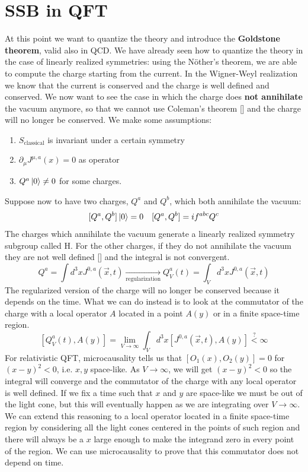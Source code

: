 \documentclass[../main.tex]{subfiles}
\begin{document}
\section{SSB in QFT}
At this point we want to quantize the theory and introduce the \textbf{Goldstone theorem}, valid also in QCD. We have already seen how to quantize the theory in the case of linearly realized symmetries: using the N\"other's theorem, we are able to compute the charge starting from the current. In the Wigner-Weyl realization we know that the current is conserved and the charge is well defined and conserved. We now want to see the case in which the charge does \textbf{not annihilate} the vacuum anymore, so that we cannot use Coleman's theorem [] and the charge will no longer be conserved. We make some assumptions:
\begin{enumerate}
    \item $S_{\text{classical}}$ is invariant under a certain symmetry
    \item $\partial_\mu J^{\mu,a}(x)=0$ as operator
    \item $Q^a\ket{0}\neq0$ for some charges.
\end{enumerate}
Suppose now to have two charges, $Q^a$ and $Q^b$, which both annihilate the vacuum:
\[
[Q^a,Q^b]\ket{0}=0 \quad [Q^a,Q^b]=if^{abc}Q^c
\]
The charges which annihilate the vacuum generate a linearly realized symmetry subgroup called H. For the other charges, if they do not annihilate the vacuum they are not well defined [] and the integral is not convergent.
\[
Q^a=\int d^3xJ^{0,a}(\Vec{x},t)\xrightarrow[\text{regularization}]{}Q^a_V(t)=\int_V d^3xJ^{0,a}(\Vec{x},t)
\]
The regularized version of the charge will no longer be conserved because it depends on the time. What we can do instead is to look at the commutator of the charge with a local operator $A$ located in a point $A(y)$ or in a finite space-time region.
\[
[Q_V^a(t),A(y)]=\lim_{V\to\infty}\int_Vd^3x[J^{0,a}(\Vec{x},t),A(y)]\stackrel{?}{<}\infty
\]
For relativistic QFT, microcausality tells us that $[O_1(x),O_2(y)]=0$ for $(x-y)^2<0$, i.e. $x,y$ space-like. As $V\to\infty$, we will get $(x-y)^2<0$ so the integral will converge and the commutator of the charge with any local operator is well defined. If we fix a time such that $x$ and $y$ are space-like we must be out of the light cone, but this will eventually happen as we are integrating over $V\to\infty$. We can extend this reasoning to a local operator located in a finite space-time region by considering all the light cones centered in the points of such region and there will always be a $x$ large enough to make the integrand zero in every point of the region. We can use microcausality to prove that this commutator does not depend on time.
\end{document}
